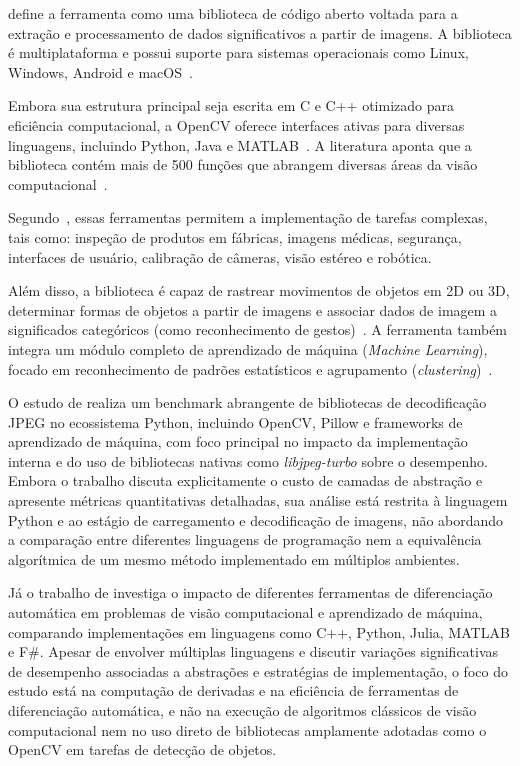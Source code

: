 \cite{bradski2000opencv} define a ferramenta como uma biblioteca de código aberto voltada para a extração e processamento de dados significativos a partir de imagens. A biblioteca é multiplataforma e possui suporte para sistemas operacionais como Linux, Windows, Android e macOS~\citep{kaehler2017learning}. 

Embora sua estrutura principal seja escrita em C e C++ otimizado para eficiência computacional, a OpenCV oferece interfaces ativas para diversas linguagens, incluindo Python, Java e MATLAB~\citep{kaehler2017learning}. A literatura aponta que a biblioteca contém mais de 500 funções que abrangem diversas áreas da visão computacional~\citep{kaehler2017learning, bradski2000opencv}. 

Segundo~\cite{kaehler2017learning}, essas ferramentas permitem a implementação de tarefas complexas, tais como: inspeção de produtos em fábricas, imagens médicas, segurança, interfaces de usuário, calibração de câmeras, visão estéreo e robótica.

Além disso, a biblioteca é capaz de rastrear movimentos de objetos em 2D ou 3D, determinar formas de objetos a partir de imagens e associar dados de imagem a significados categóricos (como reconhecimento de gestos)~\citep{bradski2000opencv}. A ferramenta também integra um módulo completo de aprendizado de máquina (\textit{Machine Learning}), focado em reconhecimento de padrões estatísticos e agrupamento (\textit{clustering})~\citep{kaehler2017learning}.

O estudo de \cite{iglovikov2025needspeedcomprehensivebenchmark} realiza um benchmark abrangente de bibliotecas de decodificação JPEG no ecossistema Python, incluindo OpenCV, Pillow e frameworks de aprendizado de máquina, com foco principal no impacto da implementação interna e do uso de bibliotecas nativas como \textit{libjpeg-turbo} sobre o desempenho. Embora o trabalho discuta explicitamente o custo de camadas de abstração e apresente métricas quantitativas detalhadas, sua análise está restrita à linguagem Python e ao estágio de carregamento e decodificação de imagens, não abordando a comparação entre diferentes linguagens de programação nem a equivalência algorítmica de um mesmo método implementado em múltiplos ambientes.

Já o trabalho de \cite{srajer2018benchmarkselectedalgorithmicdifferentiation} investiga o impacto de diferentes ferramentas de diferenciação automática em problemas de visão computacional e aprendizado de máquina, comparando implementações em linguagens como C++, Python, Julia, MATLAB e F\#. Apesar de envolver múltiplas linguagens e discutir variações significativas de desempenho associadas a abstrações e estratégias de implementação, o foco do estudo está na computação de derivadas e na eficiência de ferramentas de diferenciação automática, e não na execução de algoritmos clássicos de visão computacional nem no uso direto de bibliotecas amplamente adotadas como o OpenCV em tarefas de detecção de objetos.

